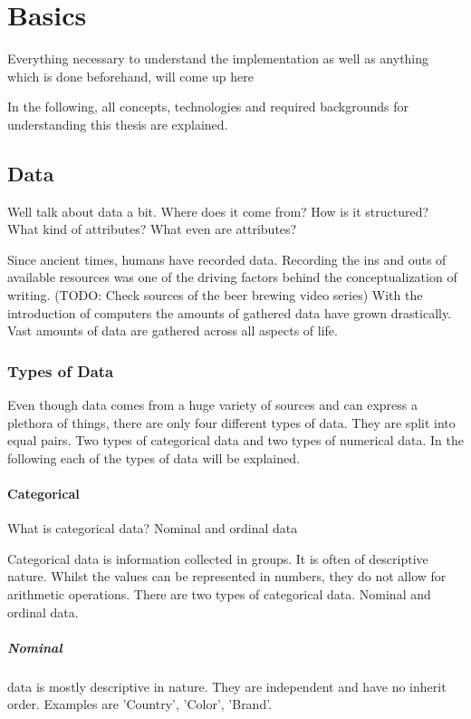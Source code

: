 \chapter{Basics}
Everything necessary to understand the implementation as well as anything which is done beforehand, will come up here

In the following, all concepts, technologies and required backgrounds for understanding this thesis are explained. 


\section{Data}
Well talk about data a bit. Where does it come from? How is it structured? What kind of attributes? What even are attributes?

Since ancient times, humans have recorded data. Recording the ins and outs of available resources was one of the driving factors behind the conceptualization of writing. (TODO: Check sources of the beer brewing video series)
With the introduction of computers the amounts of gathered data have grown drastically. Vast amounts of data are gathered across all aspects of life.

\subsection{Types of Data}
Even though data comes from a huge variety of sources and can express a plethora of things, there are only four different types of data. They are split into equal pairs. Two types of categorical data and two types of numerical data. In the following each of the types of data will be explained.

\subsubsection{Categorical}
What is categorical data? Nominal and ordinal data

Categorical data is information collected in groups. It is often of descriptive nature. Whilst the values can be represented in numbers, they do not allow for arithmetic operations.
There are two types of categorical data. Nominal and ordinal data.

\paragraph{Nominal}
data is mostly descriptive in nature. They are independent and have no inherit order. Examples are 'Country', 'Color', 'Brand'.

